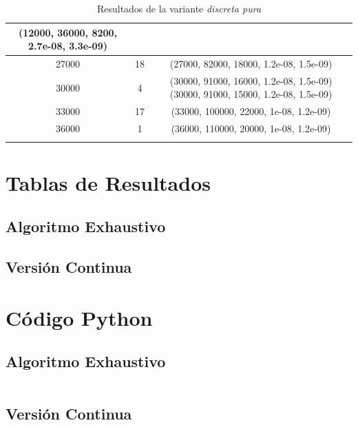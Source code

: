 \documentclass{llncs}
\begin{document}
\begin{longtable}{|c|c|c|}
		(12000, 36000, 8200, 2.7e-08, 3.3e-09)                                    \\ \hline
		27000                     &                  18                               &     (27000, 82000, 18000, 1.2e-08, 1.5e-09)                                    \\ \hline
		30000                     &                  4                               &     (30000, 91000, 16000, 1.2e-08, 1.5e-09) \newline
		(30000, 91000, 15000, 1.2e-08, 1.5e-09)                                   \\ \hline
		33000                     &                  17                               &     (33000, 100000, 22000, 1e-08, 1.2e-09)                                   \\ \hline
		36000                     &                  1                               &     (36000, 110000, 20000, 1e-08, 1.2e-09)                                  \\ \hline
		\caption{Resultados de la variante \textit{discreta pura}}
	\end{longtable}
	

	\appendix
	\section{\textbf{Tablas de Resultados}}
	\subsection{Algoritmo Exhaustivo}
	\label{subsec:Resultados Exhaustivo}
	\subsection{Versión Continua}
	\label{subsec:Resultados Continuos}
	
	\section{\textbf{Código Python}}
	\subsection{Algoritmo Exhaustivo}
	\label{subsec:pythonexhaustivo}
	\inputminted{python}{exhaustivo.py}
	\subsection{Versión Continua}
	\label{subsec:pythoncontinuo}
	\inputminted{python}{filtro_continuoLibre.py}
\end{document}
